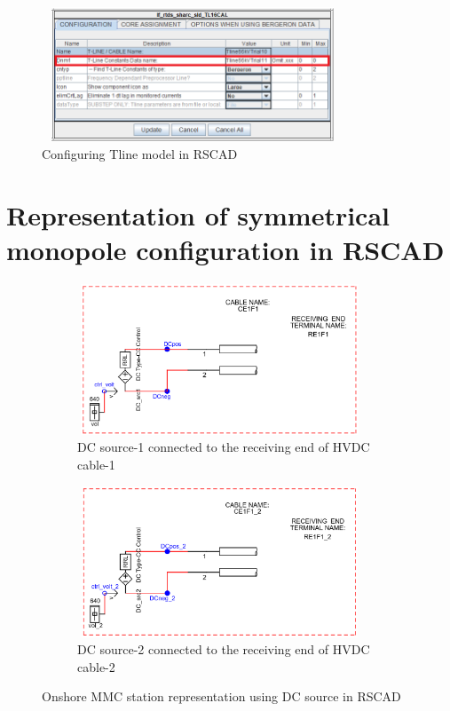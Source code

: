 \begin{figure}[H]
  \centering
  \includegraphics[height = 4cm,width = 9cm]{Diagrams/Chapter_4/TlineParaBlock_side1_mark.png}  
  \caption{Configuring Tline model in RSCAD}
  \label{fig:Tline_config_RSCAD}
\end{figure}

\section{Representation of symmetrical monopole configuration in RSCAD}
\begin{figure}[H]
\centering
\begin{subfigure}{.5\textwidth}
  \centering
  \includegraphics[height=4.5cm,width=8.5cm]{Diagrams/Chapter_4/DC_Source_Cab1.PNG}
  \caption{DC source-1 connected to the receiving end of HVDC cable-1}
  \label{DC_Source_Cab1}
\end{subfigure}%
\begin{subfigure}{.5\textwidth}
  \centering
  \includegraphics[height=4.5cm,width=8.5cm]{Diagrams/Chapter_4/DC_Source_Cab2.PNG}
  \caption{DC source-2 connected to the receiving end of HVDC cable-2}
  \label{DC_Source_Cab2}
\end{subfigure}
\caption{Onshore MMC station representation using DC source in RSCAD}
\label{fig:DC_source_cab}
\end{figure}


